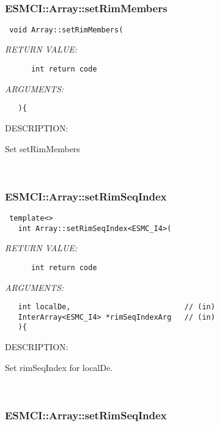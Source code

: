 \mbox{}\hrulefill\
 
\subsubsection [ESMCI::Array::setRimMembers] {ESMCI::Array::setRimMembers}


  
\begin{verbatim} void Array::setRimMembers(\end{verbatim}{\em RETURN VALUE:}
\begin{verbatim}      int return code\end{verbatim}{\em ARGUMENTS:}
\begin{verbatim}   ){\end{verbatim}
{\sf DESCRIPTION:\\ }


      Set setRimMembers
   
 
\mbox{}\hrulefill\
 
\subsubsection [ESMCI::Array::setRimSeqIndex] {ESMCI::Array::setRimSeqIndex}


  
\begin{verbatim} template<>
   int Array::setRimSeqIndex<ESMC_I4>(\end{verbatim}{\em RETURN VALUE:}
\begin{verbatim}      int return code\end{verbatim}{\em ARGUMENTS:}
\begin{verbatim}   int localDe,                          // (in)
   InterArray<ESMC_I4> *rimSeqIndexArg   // (in)
   ){\end{verbatim}
{\sf DESCRIPTION:\\ }


      Set rimSeqIndex for localDe.
   
 
\mbox{}\hrulefill\
 
\subsubsection [ESMCI::Array::setRimSeqIndex] {ESMCI::Array::setRimSeqIndex}


